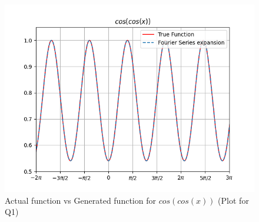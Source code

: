 \documentclass[11pt, a4paper]{article}
\begin{document}
            \begin{figure}[H]
                \centering
                \includegraphics[scale=0.9]{Figure 2.png}
                \caption{Actual function vs Generated function for $cos(cos(x))$ (Plot for Q1)}    
            \end{figure}
       
\end{document}
